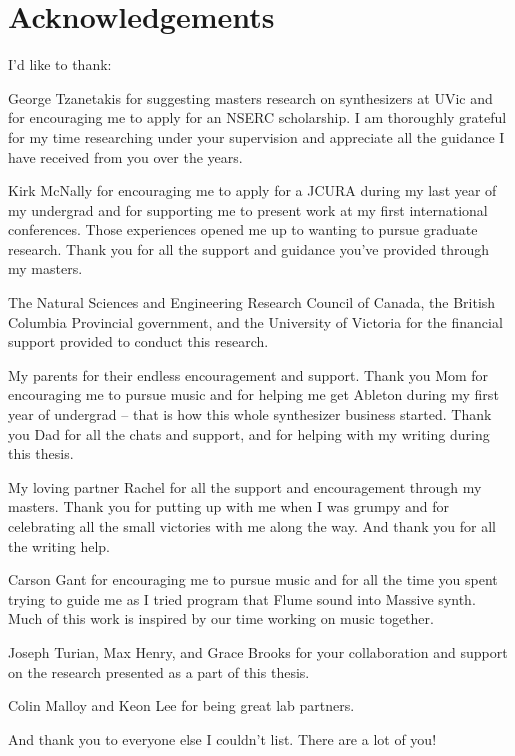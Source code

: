 \newpage
{}

\chapter*{Acknowledgements}
\noindent I'd like to thank:

George Tzanetakis for suggesting masters research on synthesizers at UVic and for encouraging me to apply for an NSERC scholarship. I am thoroughly grateful for my time researching under your supervision and appreciate all the guidance I have received from you over the years.

Kirk McNally for encouraging me to apply for a JCURA during my last year of my undergrad and for supporting me to present work at my first international conferences. Those experiences opened me up to wanting to pursue graduate research. Thank you for all the support and guidance you've provided through my masters.

The Natural Sciences and Engineering Research Council of Canada, the British Columbia Provincial government, and the University of Victoria for the financial support provided to conduct this research.

My parents for their endless encouragement and support. Thank you Mom for encouraging me to pursue music and for helping me get Ableton during my first year of undergrad -- that is how this whole synthesizer business started. Thank you Dad for all the chats and support, and for helping with my writing during this thesis.

My loving partner Rachel for all the support and encouragement through my masters. Thank you for putting up with me when I was grumpy and for celebrating all the small victories with me along the way. And thank you for all the writing help.

Carson Gant for encouraging me to pursue music and for all the time you spent trying to guide me as I tried program that Flume sound into Massive synth. Much of this work is inspired by our time working on music together.

Joseph Turian, Max Henry, and Grace Brooks for your collaboration and support on the research presented as a part of this thesis. 

Colin Malloy and Keon Lee for being great lab partners. 

And thank you to everyone else I couldn't list. There are a lot of you!




